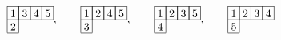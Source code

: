 \[
 \begin{array}[c]{*{4}c}\cline{1-4}
 \lr{1}&\lr{3}&\lr{4}&\lr{5}\\\cline{1-4}
 \lr{2}\\\cline{1-1}
 \end{array},\hspace{20pt}
 \begin{array}[c]{*{4}c}\cline{1-4}
 \lr{1}&\lr{2}&\lr{4}&\lr{5}\\\cline{1-4}
 \lr{3}\\\cline{1-1}
 \end{array},\hspace{20pt}
 \begin{array}[c]{*{4}c}\cline{1-4}
 \lr{1}&\lr{2}&\lr{3}&\lr{5}\\\cline{1-4}
 \lr{4}\\\cline{1-1}
 \end{array},\hspace{20pt}
 \begin{array}[c]{*{4}c}\cline{1-4}
 \lr{1}&\lr{2}&\lr{3}&\lr{4}\\\cline{1-4}
 \lr{5}\\\cline{1-1}
 \end{array}
 \]

